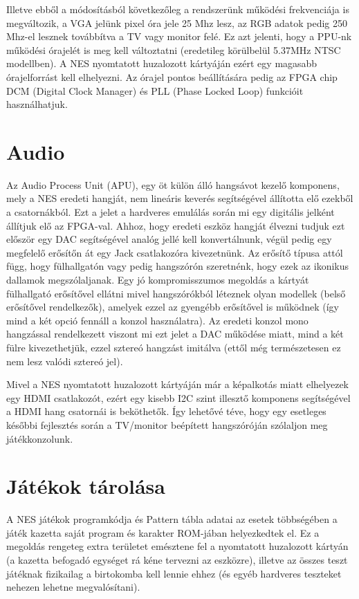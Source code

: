 Illetve ebből a módosításból következőleg a rendszerünk működési frekvenciája is megváltozik, a VGA jelünk pixel óra jele 25 Mhz lesz, az RGB adatok pedig 250 Mhz-el lesznek továbbítva a TV vagy monitor felé. Ez azt jelenti, hogy a PPU-nk működési órajelét is meg kell változtatni (eredetileg körülbelül 5.37MHz NTSC modellben). A NES nyomtatott huzalozott kártyáján ezért egy magasabb órajelforrást kell elhelyezni. Az órajel pontos beállítására pedig az FPGA chip DCM (Digital Clock Manager) és PLL (Phase Locked Loop) funkcióit használhatjuk.  

\section{Audio}
Az Audio Process Unit (APU), egy öt külön álló hangsávot kezelő komponens, mely a NES eredeti hangját, nem lineáris keverés segítségével állította elő ezekből a csatornákból. Ezt a jelet a hardveres emulálás során mi egy digitális jelként állítjuk elő az FPGA-val. Ahhoz, hogy eredeti eszköz hangját élvezni tudjuk ezt először egy DAC segítségével analóg jellé kell konvertálnunk, végül pedig egy megfelelő erősítőn át egy Jack csatlakozóra kivezetnünk. Az erősítő típusa attól függ, hogy fülhallgatón vagy pedig hangszórón szeretnénk, hogy ezek az ikonikus dallamok megszólaljanak. Egy jó kompromisszumos megoldás a kártyát fülhallgató erősítővel ellátni mivel hangszórókból léteznek olyan modellek (belső erősítővel rendelkezők), amelyek ezzel az gyengébb erősítővel is működnek (így mind a két opció fennáll a konzol használatra). Az eredeti konzol mono hangzással rendelkezett viszont mi ezt jelet a DAC működése miatt, mind a két fülre kivezethetjük, ezzel sztereó hangzást imitálva (ettől még természetesen ez nem lesz valódi sztereó jel).   

Mivel a NES nyomtatott huzalozott kártyáján már a képalkotás miatt elhelyezek egy HDMI csatlakozót, ezért egy kisebb I2C szint illesztő komponens segítségével a HDMI hang csatornái is beköthetők. Így lehetővé téve, hogy egy esetleges későbbi fejlesztés során a TV/monitor beépített hangszóróján szólaljon meg játékkonzolunk. 

\section{Játékok tárolása}
\label{sec:Game-store}
A NES játékok programkódja és Pattern tábla adatai az esetek többségében a játék kazetta saját program és karakter ROM-jában helyezkedtek el. Ez a megoldás rengeteg extra területet emésztene fel a nyomtatott huzalozott kártyán (a kazetta befogadó egységet rá kéne tervezni az eszközre), illetve az összes teszt játéknak fizikailag a birtokomba kell lennie ehhez (és egyéb hardveres teszteket nehezen lehetne megvalósítani). 

